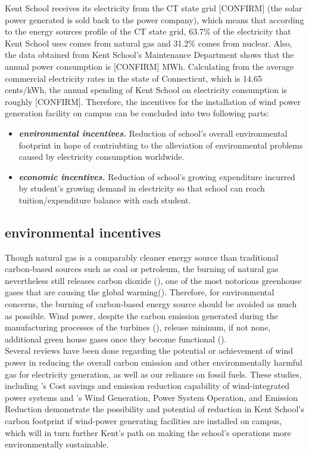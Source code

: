 \documentclass[review]{elsarticle}
\begin{document}
Kent School receives its electricity from the CT state grid [CONFIRM] (the solar power generated is sold back to the power company), which means that according to the 
energy sources profile of the CT state grid, 63.7\% of the electricity that Kent School uses comes from natural gas and 31.2\% comes from nuclear. Also, the data obtained 
from Kent School’s Maintenance Department shows that the annual power consumption is [CONFIRM] MWh. Calculating from the average commercial electricity rates in the state 
of Connecticut, which is 14.65 cents/kWh, the annual spending of Kent School on electricity consumption is roughly [CONFIRM]. Therefore, the incentives for the installation 
of wind power generation facility on campus can be concluded into two following parts:
\begin{itemize}
    \item \textit{\textbf{environmental incentives.}} Reduction of school's overall environmental footprint in hope of contriubting to the alleviation of environmental 
    problems caused by electricity consumption worldwide.
    \item \textit{\textbf{economic incentives.}} Reduction of school's growing expenditure incurred by student's growing demand in electricity so that school can reach 
    tuition/expenditure balance with each student.
\end{itemize}

\subsection{environmental incentives}
Though natural gas is a comparably cleaner energy source than traditional carbon-based sources such as coal or petroleum, the burning of natural gas nevertheless still 
releases carbon dioxide (\cite{cost_and_performance_baseline_for_fossil_energy_plants}), one of the most notorious greenhouse gases that are causing the global 
warming(\cite{Shakun2012_co2_global_warming}). Therefore, for environmental concerns, the burning of carbon-based energy source should be avoided as much as possible. 
Wind power, despite the carbon emission generated during the manufacturing processes of the turbines (\cite{Kaldellis_carbon_foortprint_of_offshore_wind_energy}), release 
mininum, if not none, additional green house gases once they become functional (\cite{IEEE_wind_carbon_reduction}).
\\\indent Several reviews have been done regarding the potential or achievement of wind power in reducing the overall carbon emission and other environmentally harmful 
gas for electricity generation, as well as our reliance on fossil fuels. These studies, including \cite{rajat_cost_saving_and_emission_reduction}'s Cost savings and 
emission reduction capability of wind-integrated power systems and \cite{IEEE_wind_carbon_reduction}'s Wind Generation, Power System Operation, and Emission Reduction 
demonstrate the possibility and potential of reduction in Kent School’s carbon footprint if wind-power generating facilities are installed on campus, which will in turn 
further Kent’s path on making the school’s operations more environmentally sustainable.
 
\end{document}
